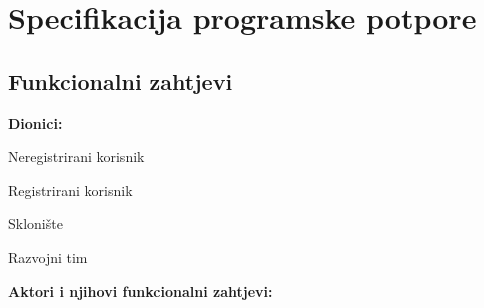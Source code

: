 \chapter{Specifikacija programske potpore}
		
	\section{Funkcionalni zahtjevi}
			
			
			\noindent \textbf{Dionici:}
			
			\begin{packed_enum}
				
				\item Neregistrirani korisnik
				\item Registrirani korisnik
				\begin{packed_item}
					\item[a)] Sklonište
				\end{packed_item}
				\item Razvojni tim
				
			\end{packed_enum}
			
			\noindent \textbf{Aktori i njihovi funkcionalni zahtjevi:}
			
